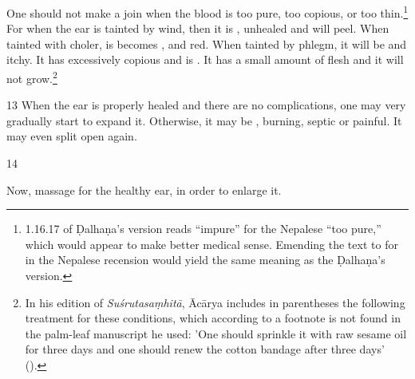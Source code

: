 \begin{translation}
One should not make a join when the blood is too pure, too copious, or too
thin.\footnote{1.16.17 of Ḍalhaṇa's version \citep[79]{vulgate} reads “impure” for
    the Nepalese “too pure,” which would appear to make better medical sense. Emending
    the text to  for  in the Nepalese recension would
    yield the same meaning as the Ḍalhaṇa's version.} For when the ear is tainted by
    wind, then it is , unhealed and will
    peel. When tainted with choler, is becomes ,
     and red.  When tainted by phlegm, it will be
     and itchy.  It has excessively copious
     and is .  It has a small
    amount of  flesh and it will not grow.\footnote{In his edition
        of \emph{Suśrutasaṃhitā}, Ācārya \citep[79 n. 1]{vulgate} includes in parentheses
        the following treatment for these conditions, which according to a footnote is not
        found in the palm-leaf manuscript he used: 'One should sprinkle it with raw sesame
        oil for three days and one should renew the cotton bandage after three days'
        ().}
    
\item[13] When the ear is properly healed and there are no complications,  one may
very gradually start to expand it.  Otherwise, it may be ,
burning, septic or painful.  It may even split open again.
    
\item [14]
    
Now, massage for the healthy ear, in order to enlarge it.
     

\end{translation}
